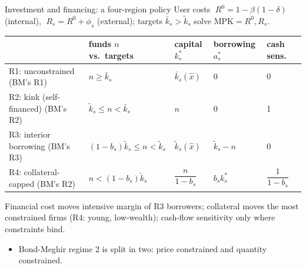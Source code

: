 \documentclass[11pt,aspectratio=169]{beamer}
\providecommand{\prodxhat}{\hat{x}}
\providecommand{\spread}[1]{\phi_{#1}}
\providecommand{\collat}[1]{b_{#1}}
\providecommand{\Rint}{R^{0}}
\providecommand{\Rext}[1]{R_{#1}}
\providecommand{\netw}{n}
\begin{document}
\begin{frame}{Investment and financing: a four-region policy}
User costs $\;\Rint=1-\beta(1-\delta)$ (internal),
$\;\Rext{s}=\Rint+\spread{s}$ (external); targets
$\bar k_{s}>\tilde k_{s}$ solve $\mathrm{MPK}=\Rint,\Rext{s}$.

\begin{center}
\renewcommand{\arraystretch}{1.25}\small
\begin{tabular}{lllll}
\toprule
 & funds $\netw$ vs.\ targets & capital $k^{*}_{s}$ &
 borrowing $a^{*}_{s}$ & cash sens.\ \\
\midrule
R1: unconstrained (BM's R1) & $\netw\geq\bar k_{s}$ & $\bar k_{s}(\prodxhat)$
 & 0 & 0 \\
R2: kink (self-financed) (BM's R2) & $\tilde k_{s}\leq\netw<\bar k_{s}$ &
 $\netw$ & 0 & 1 \\
R3: interior borrowing (BM's R3) & $(1-\collat{s})\tilde k_{s}\leq\netw
 <\tilde k_{s}$ & $\tilde k_{s}(\prodxhat)$ & $\tilde k_{s}-\netw$
 & 0 \\
R4: collateral-capped (BM's R2) & $\netw<(1-\collat{s})\tilde k_{s}$ &
 $\dfrac{\netw}{1-\collat{s}}$ & $\collat{s}k^{*}_{s}$ &
 $\dfrac{1}{1-\collat{s}}$ \\
\bottomrule
\end{tabular}
\end{center}

\medskip
{} Financial cost moves intensive margin of
R3 borrowers; collateral moves the most constrained firms (R4: young, low-wealth); cash-flow sensitivity only where constraints bind.

\medskip
\begin{itemize}
    \item Bond-Meghir regime 2 is split in two: price constrained and quantity constrained.  
\end{itemize}

\end{frame}
 
\end{document}
